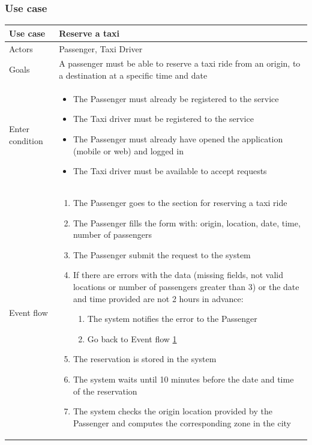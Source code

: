 \subsubsection{Use case}
\begin{center}
	\begin{longtable}{| p{} | p{} |} \hline
		Use case & \textbf{Reserve a taxi} \\ \hline 
		Actors & Passenger, Taxi Driver \\ \hline
		Goals & A passenger must be able to reserve a taxi ride from an origin, to a destination at a specific time and date \\ \hline
		Enter condition & \begin{itemize}
			\item The Passenger must already be registered to the service
			\item The Taxi driver must be registered to the service
			\item The Passenger must already have opened the application (mobile or web) and logged in
			\item The Taxi driver must be available to accept requests
		\end{itemize} \\ \hline
		Event flow & \begin{enumerate}
			\item The Passenger goes to the section for reserving a taxi ride
			\item \label{fillForm} The Passenger fills the form with: origin, location, date, time, number of passengers			
			\item The Passenger submit the request to the system
			\item If there are errors with the data (missing fields, not valid locations or number of passengers greater than 3) or the date and time provided are not 2 hours in advance:
			\begin{enumerate}
				\item The system notifies the error to the Passenger
				\item Go back to Event flow \ref{fillForm}
			\end{enumerate}
			\item The reservation is stored in the system
			\item The system waits until 10 minutes before the date and time of the reservation
			\item The system checks the origin location provided by the Passenger and computes the corresponding zone in the city

\end{enumerate}
\end{longtable}
\end{center}
